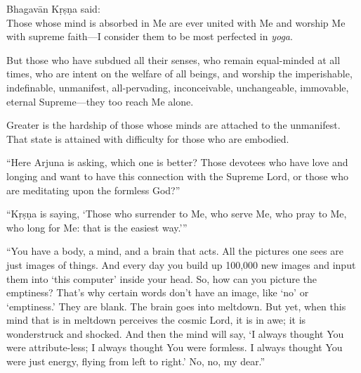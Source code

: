 {\hspace*{1em}Bhagavān Kṛṣṇa said: \\
Those whose mind is absorbed in Me are ever united with Me and worship Me with supreme faith---I consider them to be most perfected in \textit{yoga}.}

{But those who have subdued all their senses, who remain equal-minded at all times, who are intent on the welfare of all beings, and worship the imperishable, indefinable, unmanifest, all-pervading, inconceivable, unchangeable, immovable, eternal Supreme---they too reach Me alone.}

{Greater is the hardship of those whose minds are attached to the unmanifest. That state is attained with difficulty for those who are embodied.}

\enquote{Here Arjuna is asking, which one is better? Those devotees who have love and longing and want to have this connection with the Supreme Lord, or those who are meditating upon the formless God?}

\enquote{Kṛṣṇa is saying, \enquote{Those who surrender to Me, who serve Me, who pray to Me, who long for Me: that is the easiest way.}}

\enquote{You have a body, a mind, and a brain that acts. All the pictures one sees are just images of things. And every day you build up 100,000 new images and input them into \enquote{this computer} inside your head. So, how can you picture the emptiness? That’s why certain words don’t have an image, like \enquote{no} or \enquote{emptiness.} They are blank. The brain goes into meltdown. But yet, when this mind that is in meltdown perceives the cosmic Lord, it is in awe; it is wonderstruck and shocked. And then the mind will say, \enquote{I always thought You were attribute-less; I always thought You were formless. I always thought You were just energy, flying from left to right.} No, no, my dear.}

